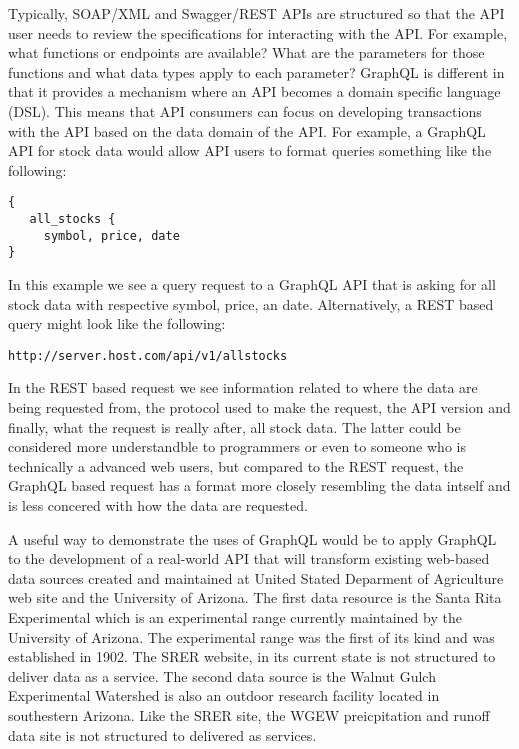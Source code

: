 Typically, SOAP/XML and Swagger/REST APIs are structured so that the API user 
needs to review the specifications for interacting with the API.  For example, 
what functions or endpoints are available?  What are the parameters for those 
functions and what data types apply to each parameter?  GraphQL is different 
in that it provides a mechanism where an API becomes a domain specific language 
(DSL).  This means that API consumers can focus on developing transactions with 
the API based on the data domain of the API.  For example, a GraphQL API for 
stock data would allow API users to format queries something like the 
following: 
\begin{verbatim}
{
   all_stocks {
     symbol, price, date
}
\end{verbatim}
In this example we see a query request to a GraphQL API that is asking for all 
stock data with respective symbol, price, an date.  Alternatively, a REST based 
query might look like the following:
\begin{verbatim}
http://server.host.com/api/v1/allstocks
\end{verbatim}
In the REST based request we see information related to where the data are being
requested from, the protocol used to make the request, the API version and finally,
what the request is really after, all stock data.  The latter could be 
considered more  understandble to programmers or even to someone who is 
technically a advanced web users, but compared to the REST request, the GraphQL 
based request has a format more closely resembling the data intself and is less 
concered with how the data are requested.

A useful way to demonstrate the uses of GraphQL would be to apply GraphQL to the 
development of a real-world API that will transform existing web-based data sources 
created and maintained at United Stated Deparment of Agriculture web site and 
the University of Arizona.  The first data resource is the Santa Rita Experimental 
which is an experimental range currently maintained by the University of Arizona.  
The experimental range was the first of its kind and was established in 
1902\cite{SrerWebSite2018}.  The SRER website, in its current state is not 
structured to deliver data as a service.  The second data source is the Walnut 
Gulch Experimental Watershed is also an outdoor research facility located in 
southestern Arizona\cite{WgewWebSite2018}.  Like the SRER site, the WGEW 
preicpitation and runoff data site is not structured to delivered as services.


